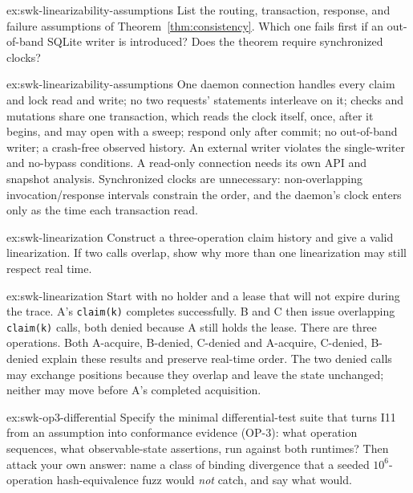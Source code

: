 \documentclass[11pt,a4paper]{article}
\theoremstyle{definition}
\theoremstyle{remark}
\begin{document}
\begin{pdexercise}[kind=Check,rating=1]{ex:swk-linearizability-assumptions}
List the routing, transaction, response, and failure assumptions of Theorem~\ref{thm:consistency}. Which one fails first if an out-of-band SQLite writer is introduced? Does the theorem require synchronized clocks?
\end{pdexercise}
\begin{pdsolution}{ex:swk-linearizability-assumptions}
One daemon connection handles every claim and lock read and write; no two requests' statements interleave on it; checks and mutations share one transaction, which reads the clock itself, once, after it begins, and may open with a sweep; respond only after commit; no out-of-band writer; a crash-free observed history. An external writer violates the single-writer and no-bypass conditions. A read-only connection needs its own API and snapshot analysis. Synchronized clocks are unnecessary: non-overlapping invocation/response intervals constrain the order, and the daemon's clock enters only as the time each transaction read.
\end{pdsolution}
\begin{pdexercise}[kind=Trace,rating=2]{ex:swk-linearization}
Construct a three-operation claim history and give a valid linearization. If two calls overlap, show why more than one linearization may still respect real time.
\end{pdexercise}
\begin{pdsolution}{ex:swk-linearization}
Start with no holder and a lease that will not expire during the trace.
A's \texttt{claim(k)} completes successfully. B and C then issue overlapping
\texttt{claim(k)} calls, both denied because A still holds the lease. There
are three operations. Both A-acquire, B-denied, C-denied and A-acquire,
C-denied, B-denied explain these results and preserve real-time order. The
two denied calls may exchange positions because they overlap and leave the
state unchanged; neither may move before A's completed acquisition.
\end{pdsolution}
\begin{pdexercise}[kind=Open,rating=3]{ex:swk-op3-differential}
Specify the minimal differential-test suite that turns I11 from an assumption into conformance evidence (OP-3): what operation sequences, what observable-state assertions, run against both runtimes? Then attack your own answer: name a class of binding divergence that a seeded $10^6$-operation hash-equivalence fuzz would \emph{not} catch, and say what would.
\end{pdexercise}
\end{document}
